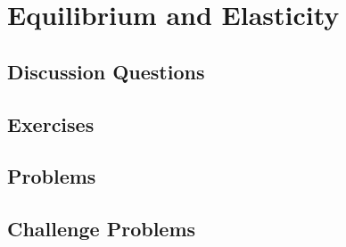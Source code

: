 
\chapter{Equilibrium and Elasticity}

\section{Discussion Questions}

\section{Exercises}

\section{Problems}

\section{Challenge Problems}
